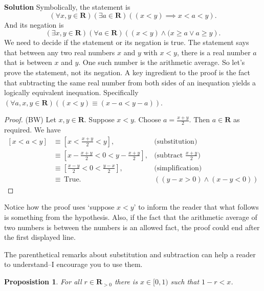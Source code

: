 \documentclass[12pt,fleqn,answers]{exam}
\newcommand{\reals}{\mathbf{R}}
\newcommand{\true}{\, \mathrm{True}}
\newenvironment{myproof}
  {\begin{shaded}\begin{proof}}
  {\end{proof}\end{shaded}}
\newtheorem{prop}{Proposistion}
\begin{document}
\noindent \textbf{Solution} Symbolically, the statement is 
    \begin{equation*}
      \left(\forall x,y \in \reals\right)
      \left(\exists a \in \reals \right)
      \left ((x< y) \implies x < a < y\right).
    \end{equation*}
    And its negation is 
     \begin{equation*}
      \left(\exists x,y \in \reals\right)
      \left(\forall a \in \reals \right)
      \left ((x< y) \land (x \geq a \lor a \geq y \right).
    \end{equation*}
    We need to decide if the statement or its negation is true. The statement says that between any two real 
    numbers $x$ and $y$ with $x < y$, there is  a real number $a$ that is between $x$ and $y$. One such number is the arithmetic average. So   let's prove the statement, not its negation.
     A key ingredient to the proof is the fact that subtracting
     the same real number from both sides of an inequation yields 
     a logically equivalent inequation. Specifically  
     $(\forall a,x,y \in \reals)( (x< y) \equiv (x-a < y-a))$.   
    \begin{myproof} (BW)
     Let $x,y \in \reals$. Suppose $x < y$. Choose $a = \frac{x+y}{2}$.
     Then $a \in \reals$ as required. We have
     \begin{align*}
       \left[ x < a < y \right] 
           &\equiv \left[ x < \frac{x+y}{2} < y \right], &\mbox{(substitution)} \\
           & \equiv \left[ x - \frac{x+y}{2} < 0 < y - \frac{x+y}{2}  \right], &\mbox{(subtract $\frac{x+y}{2}$)} \\
           & \equiv \left[ \frac{x-y}{2} < 0 < \frac{y-x}{2}  \right], &\mbox{(simplification)} \\
           & \equiv \true. &((y-x > 0) \land (x-y < 0))
     \end{align*} 
        \end{myproof}
      \noindent Notice how the proof uses `suppose $x < y$' to 
      inform the reader that what follows is something from the hypothesis.
      Also, if the fact that the arithmetic average of two numbers is between the numbers is an allowed fact, the proof
     could end after the first displayed line.

     The parenthetical remarks about substitution and subtraction can
     help a reader to understand--I encourage you to use them.
     
     \begin{prop} 
     For all $r \in \reals_{>0}$ there is $x \in [0,1)$ such that $1-r < x$. 
     \end{prop}
\end{document}
